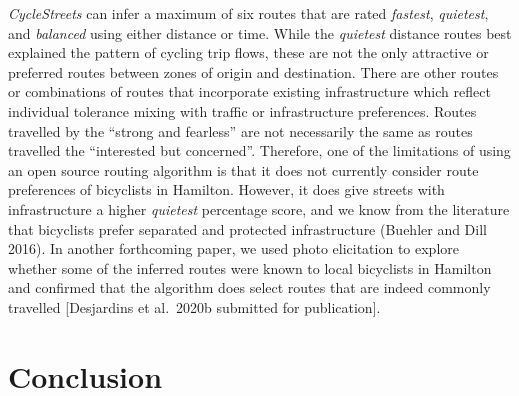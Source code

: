 \documentclass[smallextended]{svjour3}       %
\begin{document}
\emph{CycleStreets} can infer a maximum of six routes that are rated
\emph{fastest}, \emph{quietest}, and \emph{balanced} using either
distance or time. While the \emph{quietest} distance routes best
explained the pattern of cycling trip flows, these are not the only
attractive or preferred routes between zones of origin and destination.
There are other routes or combinations of routes that incorporate
existing infrastructure which reflect individual tolerance mixing with
traffic or infrastructure preferences. Routes travelled by the ``strong
and fearless'' are not necessarily the same as routes travelled the
``interested but concerned''. Therefore, one of the limitations of using
an open source routing algorithm is that it does not currently consider
route preferences of bicyclists in Hamilton. However, it does give
streets with infrastructure a higher \emph{quietest} percentage score,
and we know from the literature that bicyclists prefer separated and
protected infrastructure (Buehler and Dill 2016). In another forthcoming
paper, we used photo elicitation to explore whether some of the inferred
routes were known to local bicyclists in Hamilton and confirmed that the
algorithm does select routes that are indeed commonly travelled
{[}Desjardins et al.~2020b submitted for publication{]}.

\hypertarget{sec:conclusion}{%
\section{Conclusion}\label{sec:conclusion}}
\end{document}
